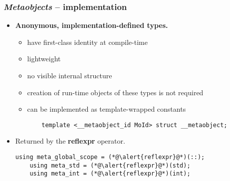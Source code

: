 \documentclass[compress,table,xcolor=table]{beamer}
\begin{document}
\begin{frame}[fragile]
\frametitle{{\em Metaobjects} -- implementation}
  \large
  \begin{itemize}
    \item {\Large \textbf{Anonymous, implementation-defined types.}}
    \begin{itemize}
      \small
      \item have first-class identity at compile-time
      \item lightweight
      \item no visible internal structure
      \item creation of run-time objects of these types is not required
      \item can be implemented as template-wrapped constants 
      \begin{lstlisting}
	template <__metaobject_id MoId> struct __metaobject;
      \end{lstlisting}
    \end{itemize}
    \item Returned by the \textbf{reflexpr} operator.
    \begin{lstlisting}[basicstyle=\normalsize\ttfamily]
	using meta_global_scope = (*@\alert{reflexpr}@*)(::);
	using meta_std = (*@\alert{reflexpr}@*)(std);
	using meta_int = (*@\alert{reflexpr}@*)(int);
    \end{lstlisting}
  \end{itemize}
\end{frame}
\end{document}
